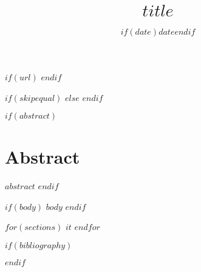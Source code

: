 \documentclass[%
  letterpaper,%
  $if(lang)$$lang$$else$english$endif$%
]{article}
\title{\vspace{-5ex} $title$}
\date{$if(date)$$date$$endif$}
\begin{document}
\setnowidow[2]
\maketitle

$if(url)$
$endif$

$if(skipequal)$
$else$
$endif$

$if(abstract)$
\section*{Abstract}
$abstract$
$endif$

$if(body)$
$body$
$endif$

$for(sections)$
$it$
$endfor$

$if(bibliography)$
\clearpage


$endif$


\end{document}

